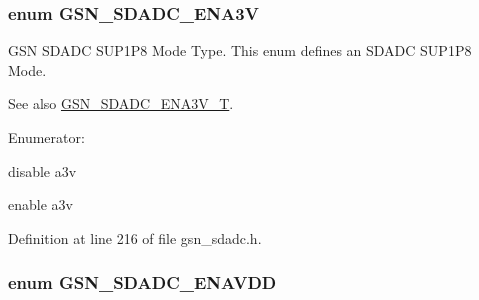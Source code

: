 \hypertarget{a00652_ga30a4571db8d9a123a6c9cf0f5c3c1146}{
\subsubsection[{GSN\_\-SDADC\_\-ENA3V}]{\setlength{\rightskip}{0pt plus 5cm}enum {\bf GSN\_\-SDADC\_\-ENA3V}}}
\label{a00652_ga30a4571db8d9a123a6c9cf0f5c3c1146}


GSN SDADC SUP1P8 Mode Type. This enum defines an SDADC SUP1P8 Mode. 

\begin{DoxySeeAlso}{See also}
\hyperlink{a00652_ga7c75febfa676ff7198e6665692e07c61}{GSN\_\-SDADC\_\-ENA3V\_\-T}. 
\end{DoxySeeAlso}
\begin{Desc}
\item[Enumerator: ]\par
\begin{description}
\item[{\em 
\hypertarget{a00652_gga30a4571db8d9a123a6c9cf0f5c3c1146ac716b0dabbe05e6906f849c0a06e0078}{
GSN\_\-SDADC\_\-A3V\_\-DISABLE}
\label{a00652_gga30a4571db8d9a123a6c9cf0f5c3c1146ac716b0dabbe05e6906f849c0a06e0078}
}]disable a3v \item[{\em 
\hypertarget{a00652_gga30a4571db8d9a123a6c9cf0f5c3c1146a35afd32a028e07d4d39c07089b9bca93}{
GSN\_\-SDADC\_\-A3V\_\-ENABLE}
\label{a00652_gga30a4571db8d9a123a6c9cf0f5c3c1146a35afd32a028e07d4d39c07089b9bca93}
}]enable a3v \end{description}
\end{Desc}



Definition at line 216 of file gsn\_\-sdadc.h.

\hypertarget{a00652_gadec6c3ec131e3065cf2061534dfdb320}{
\subsubsection[{GSN\_\-SDADC\_\-ENAVDD}]{\setlength{\rightskip}{0pt plus 5cm}enum {\bf GSN\_\-SDADC\_\-ENAVDD}}}
\label{a00652_gadec6c3ec131e3065cf2061534dfdb320}


